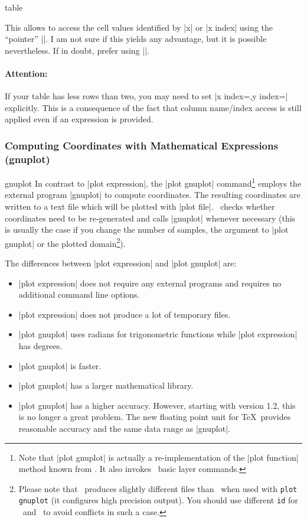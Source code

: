 {\begin{addplotoperation}[]{table}{}
\begin{enumerate}
		This allows to access the cell values identified by |x| or |x index| using the ``pointer'' |\columnx|. I am not sure if this yields any advantage, but it is possible nevertheless. If in doubt, prefer using |\thisrow|.
	\end{enumerate}

	\paragraph{Attention:} If your table has less rows than two, you may need to set |x index={},y index={}| explicitly. This is a consequence of the fact that column name/index access is still applied even if an expression is provided.
\end{addplotoperation}

\subsubsection{Computing Coordinates with Mathematical Expressions (gnuplot)}

\begin{addplotoperation}[]{gnuplot}{}
In contrast to |plot expression|, the |plot gnuplot| command\footnote{Note that |plot gnuplot| is actually a re-implementation of the |plot function| method known from \PGF. It also invokes \PGF\ basic layer commands.} employs the external program |gnuplot| to compute coordinates. The resulting coordinates are written to a text file which will be plotted with |plot file|. \PGF\ checks whether coordinates need to be re-generated and calls |gnuplot| whenever necessary (this is usually the case if you change the number of samples, the argument to |plot gnuplot| or the plotted domain\footnote{Please note that \PGFPlots\ produces slightly different files than \Tikz\ when used with \texttt{plot gnuplot} (it configures high precision output). You should use different \texttt{id} for \PGFPlots\ and \Tikz\ to avoid conflicts in such a case.}).

The differences between |plot expression| and |plot gnuplot| are:
\begin{itemize}
	\item |plot expression| does not require any external programs and requires no additional command line options.
	\item |plot expression| does not produce a lot of temporary files.
	\item |plot gnuplot| uses radians for trigonometric functions while |plot expression| has degrees.
	\item |plot gnuplot| is faster.
	\item |plot gnuplot| has a larger mathematical library.
	\item |plot gnuplot| has a higher accuracy. However, starting with version 1.2, this is no longer a great problem. The new floating point unit for \TeX\ provides reasonable accuracy and the same data range as |gnuplot|.
\end{itemize}


\end{addplotoperation}}
